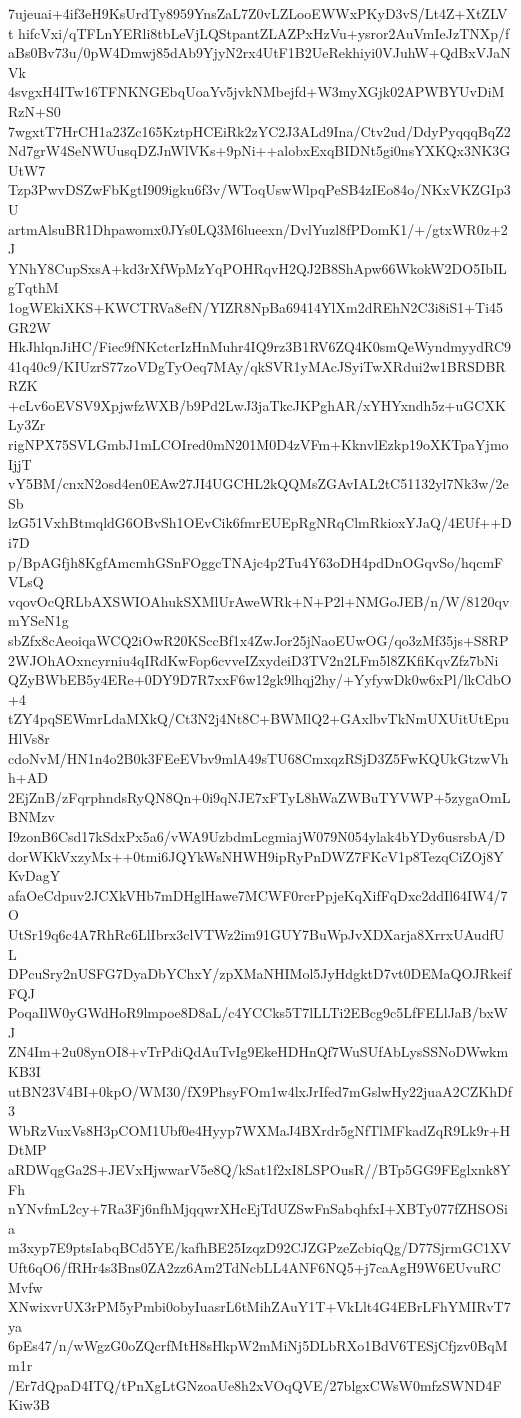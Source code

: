 7ujeuai+4if3eH9KsUrdTy8959YnsZaL7Z0vLZLooEWWxPKyD3vS/Lt4Z+XtZLVt
hifcVxi/qTFLnYERli8tbLeVjLQStpantZLAZPxHzVu+ysror2AuVmIeJzTNXp/f
aBs0Bv73u/0pW4Dmwj85dAb9YjyN2rx4UtF1B2UeRekhiyi0VJuhW+QdBxVJaNVk
4svgxH4ITw16TFNKNGEbqUoaYv5jvkNMbejfd+W3myXGjk02APWBYUvDiMRzN+S0
7wgxtT7HrCH1a23Zc165KztpHCEiRk2zYC2J3ALd9Ina/Ctv2ud/DdyPyqqqBqZ2
Nd7grW4SeNWUusqDZJnWlVKs+9pNi++alobxExqBIDNt5gi0nsYXKQx3NK3GUtW7
Tzp3PwvDSZwFbKgtI909igku6f3v/WToqUswWlpqPeSB4zIEo84o/NKxVKZGIp3U
artmAlsuBR1Dhpawomx0JYs0LQ3M6lueexn/DvlYuzl8fPDomK1/+/gtxWR0z+2J
YNhY8CupSxsA+kd3rXfWpMzYqPOHRqvH2QJ2B8ShApw66WkokW2DO5IbILgTqthM
1ogWEkiXKS+KWCTRVa8efN/YIZR8NpBa69414YlXm2dREhN2C3i8iS1+Ti45GR2W
HkJhlqnJiHC/Fiec9fNKctcrIzHnMuhr4IQ9rz3B1RV6ZQ4K0smQeWyndmyydRC9
41q40c9/KIUzrS77zoVDgTyOeq7MAy/qkSVR1yMAcJSyiTwXRdui2w1BRSDBRRZK
+cLv6oEVSV9XpjwfzWXB/b9Pd2LwJ3jaTkcJKPghAR/xYHYxndh5z+uGCXKLy3Zr
rigNPX75SVLGmbJ1mLCOIred0mN201M0D4zVFm+KknvlEzkp19oXKTpaYjmoIjjT
vY5BM/cnxN2osd4en0EAw27JI4UGCHL2kQQMsZGAvIAL2tC51132yl7Nk3w/2eSb
lzG51VxhBtmqldG6OBvSh1OEvCik6fmrEUEpRgNRqClmRkioxYJaQ/4EUf++Di7D
p/BpAGfjh8KgfAmcmhGSnFOggcTNAjc4p2Tu4Y63oDH4pdDnOGqvSo/hqcmFVLsQ
vqovOcQRLbAXSWIOAhukSXMlUrAweWRk+N+P2l+NMGoJEB/n/W/8120qvmYSeN1g
sbZfx8cAeoiqaWCQ2iOwR20KSccBf1x4ZwJor25jNaoEUwOG/qo3zMf35js+S8RP
2WJOhAOxncyrniu4qIRdKwFop6cvveIZxydeiD3TV2n2LFm5l8ZKfiKqvZfz7bNi
QZyBWbEB5y4ERe+0DY9D7R7xxF6w12gk9lhqj2hy/+YyfywDk0w6xPl/lkCdbO+4
tZY4pqSEWmrLdaMXkQ/Ct3N2j4Nt8C+BWMlQ2+GAxlbvTkNmUXUitUtEpuHlVs8r
cdoNvM/HN1n4o2B0k3FEeEVbv9mlA49sTU68CmxqzRSjD3Z5FwKQUkGtzwVhh+AD
2EjZnB/zFqrphndsRyQN8Qn+0i9qNJE7xFTyL8hWaZWBuTYVWP+5zygaOmLBNMzv
I9zonB6Csd17kSdxPx5a6/vWA9UzbdmLcgmiajW079N054ylak4bYDy6usrsbA/D
dorWKkVxzyMx++0tmi6JQYkWsNHWH9ipRyPnDWZ7FKcV1p8TezqCiZOj8YKvDagY
afaOeCdpuv2JCXkVHb7mDHglHawe7MCWF0rcrPpjeKqXifFqDxc2ddIl64IW4/7O
UtSr19q6c4A7RhRc6LlIbrx3clVTWz2im91GUY7BuWpJvXDXarja8XrrxUAudfUL
DPcuSry2nUSFG7DyaDbYChxY/zpXMaNHIMol5JyHdgktD7vt0DEMaQOJRkeifFQJ
PoqaIlW0yGWdHoR9lmpoe8D8aL/c4YCCks5T7lLLTi2EBcg9c5LfFELlJaB/bxWJ
ZN4Im+2u08ynOI8+vTrPdiQdAuTvIg9EkeHDHnQf7WuSUfAbLysSSNoDWwkmKB3I
utBN23V4BI+0kpO/WM30/fX9PhsyFOm1w4lxJrIfed7mGslwHy22juaA2CZKhDf3
WbRzVuxVs8H3pCOM1Ubf0e4Hyyp7WXMaJ4BXrdr5gNfTlMFkadZqR9Lk9r+HDtMP
aRDWqgGa2S+JEVxHjwwarV5e8Q/kSat1f2xI8LSPOusR//BTp5GG9FEglxnk8YFh
nYNvfmL2cy+7Ra3Fj6nfhMjqqwrXHcEjTdUZSwFnSabqhfxI+XBTy077fZHSOSia
m3xyp7E9ptsIabqBCd5YE/kafhBE25IzqzD92CJZGPzeZcbiqQg/D77SjrmGC1XV
Uft6qO6/fRHr4s3Bns0ZA2zz6Am2TdNcbLL4ANF6NQ5+j7caAgH9W6EUvuRCMvfw
XNwixvrUX3rPM5yPmbi0obyIuasrL6tMihZAuY1T+VkLlt4G4EBrLFhYMIRvT7ya
6pEs47/n/wWgzG0oZQcrfMtH8sHkpW2mMiNj5DLbRXo1BdV6TESjCfjzv0BqMm1r
/Er7dQpaD4ITQ/tPnXgLtGNzoaUe8h2xVOqQVE/27blgxCWsW0mfzSWND4FKiw3B
